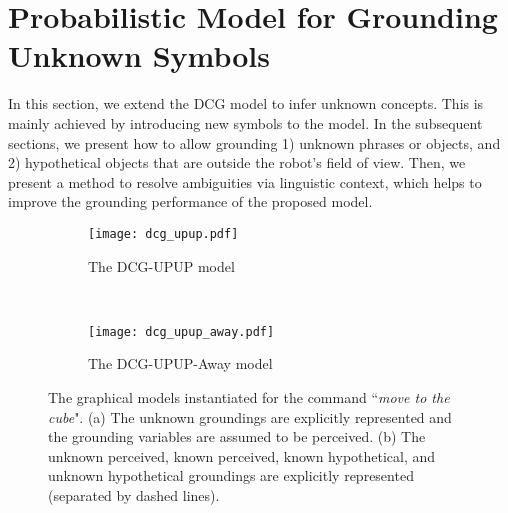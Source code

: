 \section{Probabilistic Model for Grounding Unknown Symbols} \label{sec:technical}

In this section, we extend the DCG model to infer unknown concepts. This is mainly achieved by introducing new symbols to the model. In the subsequent sections, we present how to allow grounding 1) unknown phrases or objects, and 2) hypothetical objects that are outside the robot's field of view. Then, we present a method to resolve ambiguities via linguistic context, which helps to improve the grounding performance of the proposed model.

\begin{figure*}
\centering
\begin{subfigure}[t]{0.40\textwidth}
\centering
\texttt{[image: dcg\_upup.pdf]}
\caption{The DCG-UPUP model}
\label{fig:dcg-upup}
\end{subfigure}
~~~~
\begin{subfigure}[t]{0.52\textwidth}
\centering
\texttt{[image: dcg\_upup\_away.pdf]}
\caption{The DCG-UPUP-Away model}
\label{fig:dcg-upup-away}
\end{subfigure}
\caption{The graphical models instantiated for the command ``\emph{move to the cube}". (a) The unknown groundings are explicitly represented and the grounding variables are assumed to be perceived. (b) The unknown perceived, known perceived, known hypothetical, and unknown hypothetical groundings are explicitly represented (separated by dashed lines).}
\end{figure*}

